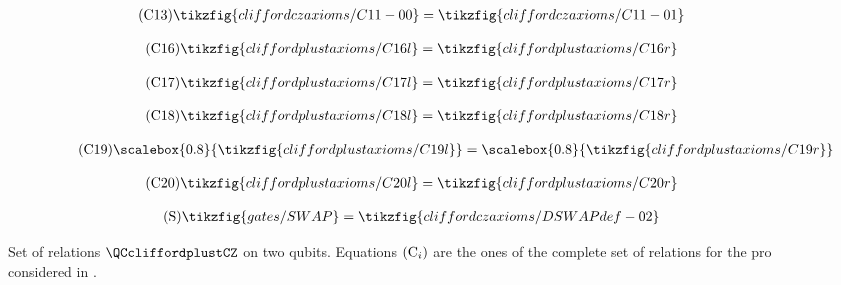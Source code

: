 \begin{figure}[ht]
{\begin{minipage}{.975\textwidth}
\begin{center}
\begin{subfigure}{0.62\textwidth}
            \begin{align}\label{t-C13}\tag{C13}\tikzfig{cliffordczaxioms/C11-00}=\tikzfig{cliffordczaxioms/C11-01}\end{align}
        \end{subfigure}
        \begin{subfigure}{0.39\textwidth}
            \begin{align}\label{t-C16}\tag{C16}\tikzfig{cliffordplustaxioms/C16l}=\tikzfig{cliffordplustaxioms/C16r}\end{align}
        \end{subfigure}
        \begin{subfigure}{0.69\textwidth}
            \begin{align}\label{t-C17}\tag{C17}\tikzfig{cliffordplustaxioms/C17l}=\tikzfig{cliffordplustaxioms/C17r}\end{align}
        \end{subfigure}
        \begin{subfigure}{0.84\textwidth}
            \begin{align}\label{t-C18}\tag{C18}\tikzfig{cliffordplustaxioms/C18l}=\tikzfig{cliffordplustaxioms/C18r}\end{align}
        \end{subfigure}
        \begin{subfigure}{0.95\textwidth}
            \begin{align}\label{old-t-C19}\tag{C19}\scalebox{0.8}{\tikzfig{cliffordplustaxioms/C19l}}=\scalebox{0.8}{\tikzfig{cliffordplustaxioms/C19r}}\end{align}
        \end{subfigure}
        \begin{subfigure}{0.69\textwidth}
            \begin{align}\label{old-t-C20}\tag{C20}\tikzfig{cliffordplustaxioms/C20l}=\tikzfig{cliffordplustaxioms/C20r}\end{align}
        \end{subfigure}
        \begin{subfigure}{.44\textwidth}
            \begin{align}\label{t-DSWAPdef}\tag{S}\tikzfig{gates/SWAP}=\tikzfig{cliffordczaxioms/DSWAPdef-02}\end{align}
        \end{subfigure}
    \end{center}\end{minipage}}
    \caption{Set of relations $\QCcliffordplustCZ$ on two qubits. Equations $(\textup{C}_i)$ are the ones of the complete set of relations for the pro considered in \cite{SelingerCliffordPlusT}.}
    \label{appendix:oldgraphicallanguage4}
\end{figure}




